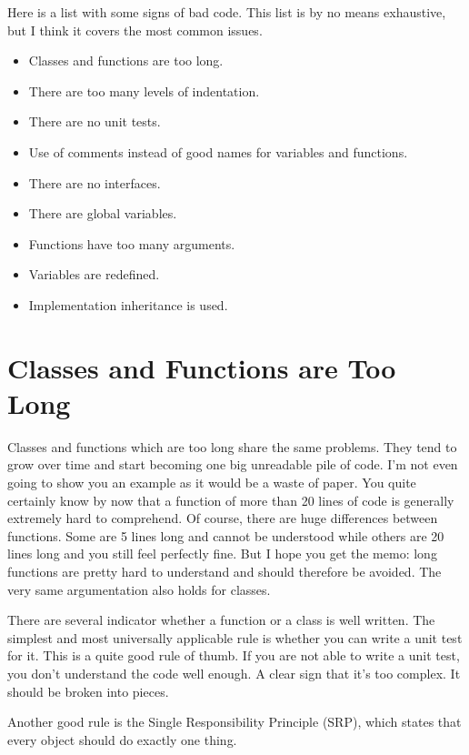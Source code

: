 Here is a list with some signs of bad code. This list is by no means exhaustive, but I think it covers the most common issues.

\begin{itemize}
    \item Classes and functions are too long.
    \item There are too many levels of indentation.
    \item There are no unit tests.
    \item Use of comments instead of good names for variables and functions.
    \item There are no interfaces.
    \item There are global variables.
    \item Functions have too many arguments.
    \item Variables are redefined.
    \item Implementation inheritance is used.
\end{itemize}

\section{Classes and Functions are Too Long}

Classes and functions which are too long share the same problems. They tend to grow over time and start becoming one big unreadable pile of code. I'm not even going to show you an example as it would be a waste of paper. You quite certainly know by now that a function of more than 20 lines of code is generally extremely hard to comprehend. Of course, there are huge differences between functions. Some are 5 lines long and cannot be understood while others are 20 lines long and you still feel perfectly fine. But I hope you get the memo: long functions are pretty hard to understand and should therefore be avoided. The very same argumentation also holds for classes.

There are several indicator whether a function or a class is well written. The simplest and most universally applicable rule is whether you can write a unit test for it. This is a quite good rule of thumb. If you are not able to write a unit test, you don't understand the code well enough. A clear sign that it's too complex. It should be broken into pieces.

Another good rule is the Single Responsibility Principle (SRP), which states that every object should do exactly one thing. 

